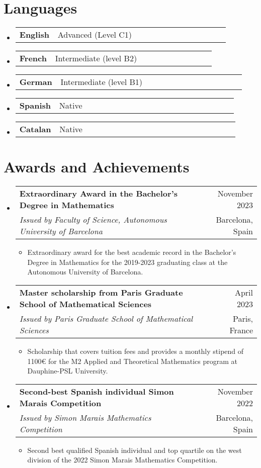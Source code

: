 \documentclass[a4paper,11pt]{article}
\makeatletter
\newcommand{\resumeSectionTypeOne}[2]{
  \item\begin{tabular*}{0.99\textwidth}[t]{
    p{0.18\linewidth}p{0.81\linewidth}
  }
  \textbf{#1} & #2
  \end{tabular*}\vspace{-2pt}
}
\newcommand{\resumeQuadHeading}[4]{
  \item
  \begin{tabular*}{0.96\textwidth}[t]{l@{\extracolsep{\fill}}r}
    \textbf{#1} & \small #2 \\
    \small#3 & \small #4 \\
  \end{tabular*}
}
\newcommand{\resumeHeadingListStart}{
  \begin{itemize}[leftmargin=0.15in, label={}]
}
\newcommand{\resumeHeadingListEnd}{\end{itemize}}
\makeatother
\begin{document}
\section{Languages}
\resumeHeadingListStart{}
\resumeSectionTypeOne{English}{Advanced (Level C1)}
\resumeSectionTypeOne{French}{Intermediate (level B2)}
\resumeSectionTypeOne{German}{Intermediate (level B1)}
\resumeSectionTypeOne{Spanish}{Native}
\resumeSectionTypeOne{Catalan}{Native}
\resumeHeadingListEnd{}

\section{Awards and Achievements}
\resumeHeadingListStart{}
\resumeQuadHeading{Extraordinary Award in the Bachelor's Degree in Mathematics}{November 2023}{\textit{Issued by Faculty of Science, Autonomous University of Barcelona}}{Barcelona, Spain}
\begin{itemize}[leftmargin=3em, itemsep=0.1em, topsep=2pt]
  \item \small Extraordinary award for the best academic record in the Bachelor's Degree in Mathematics for the 2019-2023 graduating class at the Autonomous University of Barcelona.
\end{itemize}
\resumeHeadingListEnd{}

\resumeHeadingListStart{}
\resumeQuadHeading{Master scholarship from Paris Graduate School of Mathematical Sciences}{April 2023}{\textit{Issued by Paris Graduate School of Mathematical Sciences}}{Paris, France}
\begin{itemize}[leftmargin=3em, itemsep=0.1em, topsep=2pt]
  \item \small Scholarship that covers tuition fees and provides a monthly stipend of 1100€ for the M2 Applied and Theoretical Mathematics program at Dauphine-PSL University.
\end{itemize}
\resumeHeadingListEnd{}

\resumeHeadingListStart{}
\resumeQuadHeading{Second-best Spanish individual Simon Marais Competition}{November 2022}{\textit{Issued by Simon Marais Mathematics Competition}}{Barcelona, Spain}
\begin{itemize}[leftmargin=3em, itemsep=0.1em, topsep=2pt]
  \item \small Second best qualified Spanish individual and top quartile on the west division of the 2022 Simon Marais Mathematics Competition.
\end{itemize}
\resumeHeadingListEnd{}
\end{document}
